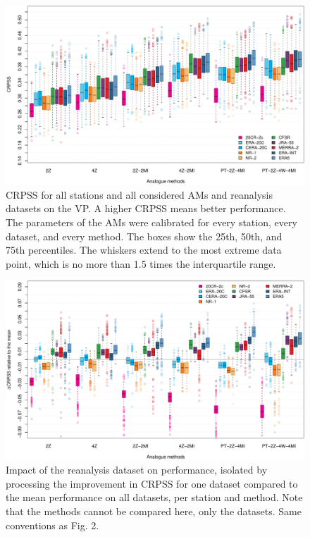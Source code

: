 \documentclass[alpha-refs]{wiley-article}
\begin{document}
\begin{figure}[bt]
	\centering
	\includegraphics[width=\textwidth]{figure-2.pdf}
	\caption{CRPSS for all stations and all considered AMs and reanalysis datasets on the VP. A higher CRPSS means better performance. The parameters of the AMs were calibrated for every station, every dataset, and every method. The boxes show the 25th, 50th, and 75th percentiles. The whiskers extend to the most extreme data point, which is no more than 1.5 times the interquartile range.}
	\label{fig:comparison_values}
\end{figure}

\begin{figure}[bt]
	\centering
	\includegraphics[width=\textwidth]{figure-3.pdf}
	\caption{Impact of the reanalysis dataset on performance, isolated by processing the improvement in CRPSS for one dataset compared to the mean performance on all datasets, per station and method. Note that the methods cannot be compared here, only the datasets. Same conventions as Fig. 2.}
	\label{fig:comparison_relative}
\end{figure}
\end{document}
